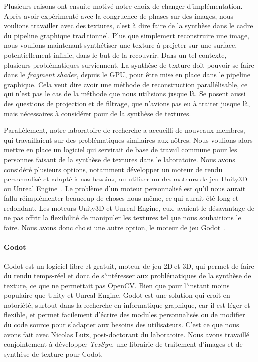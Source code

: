 \bigskip

Plusieurs raisons ont ensuite motivé notre choix de changer d'implémentation. Après avoir expérimenté avec la congruence de phases sur des images, nous voulions travailler avec des textures, c'est à dire faire de la synthèse dans le cadre du pipeline graphique traditionnel. Plus que simplement reconstruire une image, nous voulions maintenant synthétiser une texture à projeter sur une surface, potentiellement infinie, dans le but de la recouvrir. Dans un tel contexte, plusieurs problématiques surviennent. La synthèse de texture doit pouvoir se faire dans le \textit{fragment shader}, depuis le GPU, pour être mise en place dans le pipeline graphique. Cela veut dire avoir une méthode de reconstruction parallélisable, ce qui n'est pas le cas de la méthode que nous utilisions jusque là. Se posent aussi des questions de projection et de filtrage, que n'avions pas eu à traiter jusque là, mais nécessaires à considérer pour de la synthèse de textures.

Parallèlement, notre laboratoire de recherche a accueilli de nouveaux membres, qui travaillaient sur des problématiques similaires aux nôtres. Nous voulions alors mettre en place un logiciel qui servirait de base de travail commune pour les personnes faisant de la synthèse de textures dans le laboratoire. Nous avons considéré plusieurs options, notamment développer un moteur de rendu personnalisé et adapté à nos besoins, ou utiliser un des moteurs de jeu Unity3D~\cite{unity_engine} ou Unreal Engine~\cite{unreal_engine}. Le problème d'un moteur personnalisé est qu'il nous aurait fallu réimplémenter beaucoup de choses nous-même, ce qui aurait été long et redondant. Les moteurs Unity3D et Unreal Engine, eux, avaient le désavantage de ne pas offrir la flexibilité de manipuler les textures tel que nous souhaitions le faire. Nous avons donc choisi une autre option, le moteur de jeu Godot~\cite{godot_game_engine}.

\paragraph{Godot}

Godot est un logiciel libre et gratuit, moteur de jeu 2D et 3D, qui permet de faire du rendu temps-réel et donc de s'intéresser aux problématiques de la synthèse de texture, ce que ne permettait pas OpenCV. Bien que pour l'instant moins populaire que Unity et Unreal Engine, Godot est une solution qui croit en notoriété, surtout dans la recherche en informatique graphique, car il est léger et flexible, et permet facilement d'écrire des modules personnalisés ou de modifier du code source pour s'adapter aux besoins des utilisateurs. C'est ce que nous avons fait avec Nicolas Lutz, post-doctorant du laboratoire. Nous avons travaillé conjointement à développer \textit{TexSyn}, une librairie \cpp de traitement d'images et de synthèse de texture pour Godot.

